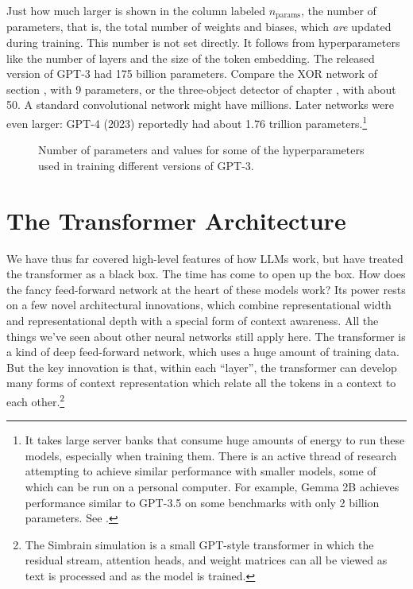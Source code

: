 Just how much larger is shown in the column labeled $n_\text{params}$, the
number of parameters, that is, the total number of weights and biases, which
\emph{are} updated during training. This number is not set directly. It follows
from hyperparameters like the number of layers and the size of the token
embedding. The released version of GPT-3 had 175 billion parameters. Compare
the XOR network of section , with 9 parameters, or the
three-object detector of chapter , with about 50. A standard
convolutional network might have millions. Later networks were even larger:
GPT-4 (2023) reportedly had about 1.76 trillion parameters.\footnote{It takes large server banks that consume huge
amounts of energy to run these models, especially when training them. There is an active thread of research
attempting to achieve similar performance with smaller models, some of which
can be run on a  personal computer. For example, Gemma 2B achieves performance
similar to GPT-3.5 on some benchmarks with only 2 billion parameters. See
.}

\begin{figure}[ht]
\centering
{}
\caption[From \cite{brown2020language}.]{Number of parameters and
values for some of the hyperparameters used in training different versions of
GPT-3.
}
\label{gptParams}
\end{figure}


\section{The Transformer Architecture}\label{transformers}


 
We have thus far covered high-level features of how LLMs work, but have treated
the transformer as a black box. The time has come to open up the box. How does
the fancy feed-forward network at the heart of these models work? Its power
rests on a few novel architectural innovations, which combine representational
width and representational depth with a special form of context awareness. All
the things we've seen about other neural networks still apply here. The
transformer is a kind of deep feed-forward network, which uses a huge amount of
training data. But the key innovation is that, within each ``layer'', the
transformer can develop many forms of context representation which relate all
the tokens in a context to each other.\footnote{The Simbrain simulation  is a small GPT-style transformer in which the residual stream, attention heads, and weight matrices can all be viewed as text is processed and as the model is trained.}

